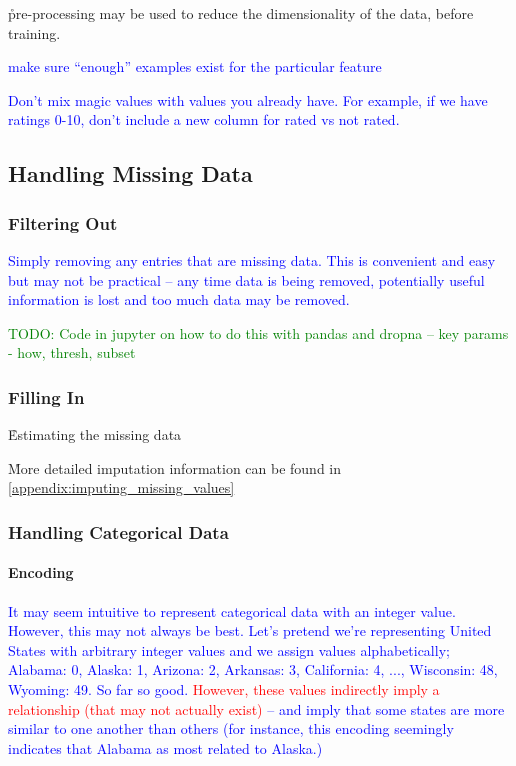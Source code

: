 
\r{pre-processing may be used to reduce the dimensionality of the data, before training.}

\textcolor{blue}{make sure ``enough'' examples exist for the particular feature}

\textcolor{blue}{Don't mix magic values with values you already have. For example, if we have ratings 0-10, don't include a new column for rated vs not rated.}

\subsection{Handling Missing Data}

\subsubsection{Filtering Out}

\textcolor{blue}{Simply removing any entries that are missing data. This is convenient and easy but may not be practical -- any time data is being removed, potentially useful information is lost and too much data may be removed.}

\textcolor{green}{TODO: Code in jupyter on how to do this with pandas and dropna -- key params - how, thresh, subset}

\subsubsection{Filling In}

\r{Estimating the missing data}

\r{More detailed imputation information can be found in \ref{appendix:imputing_missing_values}}

\subsubsection{Handling Categorical Data}

\paragraph{Encoding}

\textcolor{blue}{It may seem intuitive to represent categorical data with an integer value. However, this may not always be best. Let's pretend we're representing United States with arbitrary integer values and we assign values alphabetically; Alabama: 0, Alaska: 1, Arizona: 2, Arkansas: 3, California: 4, ..., Wisconsin: 48, Wyoming: 49. So far so good. \textcolor{red}{However, these values indirectly imply a relationship (that may not actually exist)} -- and imply that some states are more similar to one another than others (for instance, this encoding seemingly indicates that Alabama as most related to Alaska.) }

